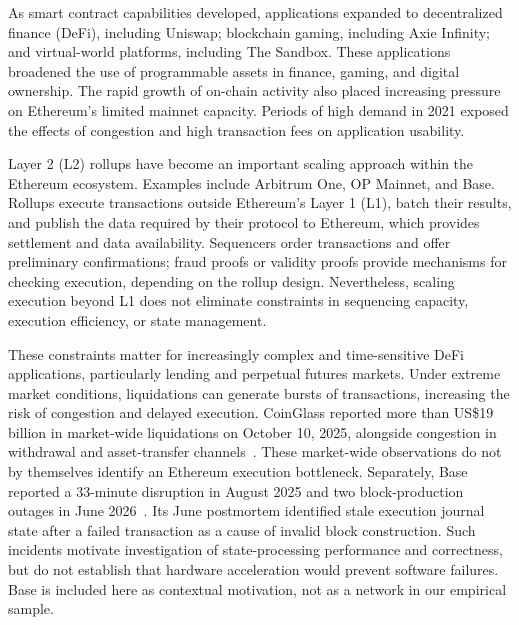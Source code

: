 \documentclass[runningheads]{llncs}
\begin{document}
As smart contract capabilities developed, applications expanded to decentralized finance (DeFi), including Uniswap; blockchain gaming, including Axie Infinity; and virtual-world platforms, including The Sandbox. These applications broadened the use of programmable assets in finance, gaming, and digital ownership. The rapid growth of on-chain activity also placed increasing pressure on Ethereum's limited mainnet capacity. Periods of high demand in 2021 exposed the effects of congestion and high transaction fees on application usability.

Layer 2 (L2) rollups have become an important scaling approach within the Ethereum ecosystem. Examples include Arbitrum One, OP Mainnet, and Base. Rollups execute transactions outside Ethereum's Layer 1 (L1), batch their results, and publish the data required by their protocol to Ethereum, which provides settlement and data availability. Sequencers order transactions and offer preliminary confirmations; fraud proofs or validity proofs provide mechanisms for checking execution, depending on the rollup design. Nevertheless, scaling execution beyond L1 does not eliminate constraints in sequencing capacity, execution efficiency, or state management.

These constraints matter for increasingly complex and time-sensitive DeFi applications, particularly lending and perpetual futures markets. Under extreme market conditions, liquidations can generate bursts of transactions, increasing the risk of congestion and delayed execution. CoinGlass reported more than US\$19 billion in market-wide liquidations on October 10, 2025, alongside congestion in withdrawal and asset-transfer channels~\cite{coinglass}. These market-wide observations do not by themselves identify an Ethereum execution bottleneck. Separately, Base reported a 33-minute disruption in August 2025 and two block-production outages in June 2026~\cite{baseaug,basejun}. Its June postmortem identified stale execution journal state after a failed transaction as a cause of invalid block construction. Such incidents motivate investigation of state-processing performance and correctness, but do not establish that hardware acceleration would prevent software failures. Base is included here as contextual motivation, not as a network in our empirical sample.
\end{document}
